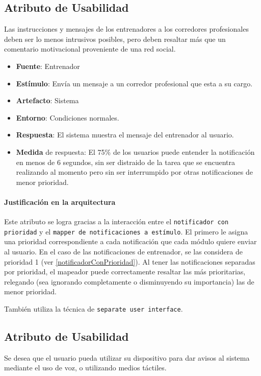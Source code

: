 \subsection{Atributo de Usabilidad}
Las instrucciones y mensajes de los entrenadores a los corredores profesionales deben ser lo menos intrusivos posibles, pero deben resaltar más que un comentario motivacional proveniente de una red social.

\begin{itemize}
  \item \textbf{Fuente}: Entrenador
  \item \textbf{Estímulo}: Envía un mensaje a un corredor profesional que esta a su cargo.
  \item \textbf{Artefacto}: Sistema
  \item \textbf{Entorno}: Condiciones normales.
  \item \textbf{Respuesta}: El sistema muestra el mensaje del entrenador al usuario.
  \item \textbf{Medida} de respuesta: El 75\% de los usuarios puede entender la notificación en menos de 6 segundos, sin ser distraido de la tarea que se encuentra realizando al momento pero sin ser interrumpido por otras notificaciones de menor prioridad.
\end{itemize}

\paragraph{Justificación en la arquitectura}
Este atributo se logra gracias a la interacción entre el \texttt{notificador con prioridad} y el \texttt{mapper de notificaciones a estímulo}. El primero le asigna una prioridad correspondiente a cada notificación que cada módulo quiere enviar al usuario. En el caso de las notificaciones de entrenador, se las considera de prioridad 1 (ver \ref{notificadorConPrioridad}). Al tener las notificaciones separadas por prioridad, el mapeador puede correctamente resaltar las más prioritarias, relegando (sea ignorando completamente o disminuyendo su importancia) las de menor prioridad.

También utiliza la técnica de \texttt{separate user interface}.

\subsection{Atributo de Usabilidad}
Se desea que el usuario pueda utilizar su dispositivo para dar avisos al sistema mediante el uso de voz, o utilizando medios táctiles.

